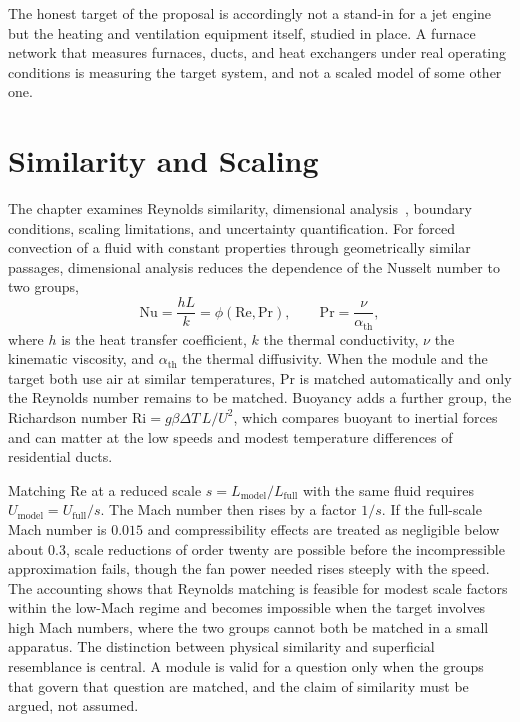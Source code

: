 The honest target of the proposal is accordingly not a stand-in for a jet engine but the heating and ventilation equipment itself, studied in place. A furnace network that measures furnaces, ducts, and heat exchangers under real operating conditions is measuring the target system, and not a scaled model of some other one.

\section{Similarity and Scaling}

The chapter examines Reynolds similarity, dimensional analysis~\cite{buckingham1914}, boundary conditions, scaling limitations, and uncertainty quantification. For forced convection of a fluid with constant properties through geometrically similar passages, dimensional analysis reduces the dependence of the Nusselt number to two groups,
\[
\mathrm{Nu}=\frac{hL}{k}=\phi(\mathrm{Re},\mathrm{Pr}),\qquad \mathrm{Pr}=\frac{\nu}{\alpha_{\mathrm{th}}},
\]
where $h$ is the heat transfer coefficient, $k$ the thermal conductivity, $\nu$ the kinematic viscosity, and $\alpha_{\mathrm{th}}$ the thermal diffusivity. When the module and the target both use air at similar temperatures, $\mathrm{Pr}$ is matched automatically and only the Reynolds number remains to be matched. Buoyancy adds a further group, the Richardson number $\mathrm{Ri}=g\beta\Delta T\,L/U^{2}$, which compares buoyant to inertial forces and can matter at the low speeds and modest temperature differences of residential ducts.

Matching $\mathrm{Re}$ at a reduced scale $s=L_{\mathrm{model}}/L_{\mathrm{full}}$ with the same fluid requires $U_{\mathrm{model}}=U_{\mathrm{full}}/s$. The Mach number then rises by a factor $1/s$. If the full-scale Mach number is $0.015$ and compressibility effects are treated as negligible below about $0.3$, scale reductions of order twenty are possible before the incompressible approximation fails, though the fan power needed rises steeply with the speed. The accounting shows that Reynolds matching is feasible for modest scale factors within the low-Mach regime and becomes impossible when the target involves high Mach numbers, where the two groups cannot both be matched in a small apparatus. The distinction between physical similarity and superficial resemblance is central. A module is valid for a question only when the groups that govern that question are matched, and the claim of similarity must be argued, not assumed.

